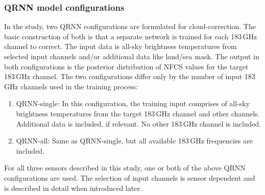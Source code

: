 \documentclass[amt, manuscript]{copernicus}
\begin{document}
\subsubsection{QRNN model configurations}
%
\label{sec:QRNN_configuration}
In the study, two QRNN configurations are formulated for cloud-correction. The
basic construction of both is that a separate network is trained for each
183\,GHz channel to correct. The input data is all-sky brightness temperatures
from selected input channels and/or additional data like land/sea mask. The
output in both configurations is the posterior distribution of NFCS values for
the target 183\,GHz channel. The two configurations differ only by the number of
input 183\,GHz channels used in the training process:

\begin{enumerate}
	\item QRNN-single: In this configuration, the training input comprises of  all-sky brightness temperatures from the target 183\,GHz channel and other channels. Additional data is included, if relevant. No other 183\,GHz channel is included.  
	
	\item QRNN-all: Same as QRNN-single, but all available 183\,GHz frequencies are included.      
\end{enumerate}

For all three sensors described in this study, one or both of the above QRNN configurations are used. The selection of input channels is sensor dependent and is described in detail when introduced later.  
\end{document}
